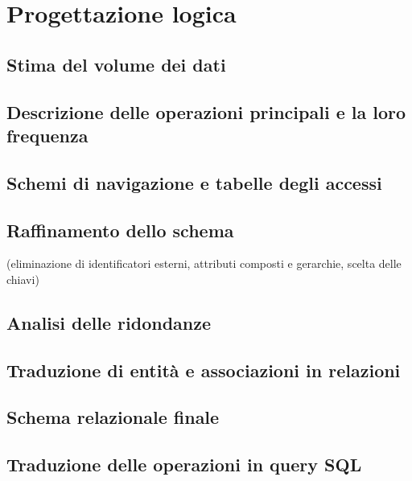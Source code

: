 \section{Progettazione logica}
\subsection{Stima del volume dei dati}

\subsection{Descrizione delle operazioni principali e la loro frequenza}

\subsection{Schemi di navigazione e tabelle degli accessi}

\subsection{Raffinamento dello schema}
(eliminazione di identificatori esterni, attributi composti e gerarchie, scelta delle chiavi)

\subsection{Analisi delle ridondanze}

\subsection{Traduzione di entità e associazioni in relazioni}

\subsection{Schema relazionale finale}

\subsection{Traduzione delle operazioni in query SQL}
